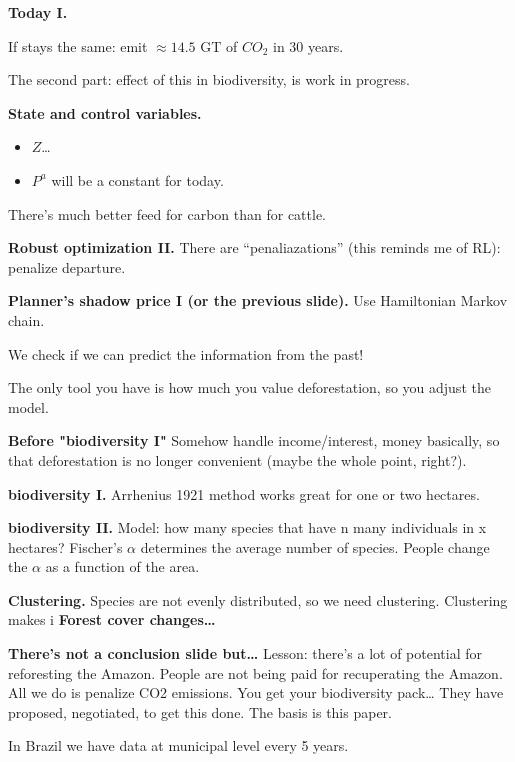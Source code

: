 \medskip\noindent
{\bf Today I.}

If stays the same: emit $\approx 14.5$ GT
of $CO_2$ in 30 years.

The second part: effect of this in
biodiversity, is work in progress.

\medskip\noindent
{\bf State and control variables.}
\begin{itemize}
\item $Z$…
\item $P^a$ will be a constant for today.
\end{itemize}

\begin{remark}
\label{remark-carbon-cattle}
There's much better feed for carbon
than for cattle.
\end{remark}

\medskip\noindent
{\bf Robust optimization II.}
There are ``penaliazations'' (this reminds
me of RL): penalize departure.

\medskip\noindent
{\bf Planner's shadow price I
(or the previous slide).}
Use Hamiltonian Markov chain.

We check if we can predict the
information from the past!

The only tool you have is how much you value
deforestation, so you adjust the model.

\medskip\noindent
{\bf Before "biodiversity I"}
Somehow handle income/interest, money
basically, so that deforestation is no
longer convenient (maybe the whole point,
right?).

\medskip\noindent
{\bf biodiversity I.}
Arrhenius 1921 method works great
for one or two hectares.

\medskip\noindent
{\bf biodiversity II.}
Model: how many species that have n many
individuals in x hectares? Fischer's $\alpha$
determines the average number of species.
People change the $\alpha$ as a function
of the area.

\medskip\noindent
{\bf Clustering.}
Species are not evenly distributed,
so we need clustering. Clustering makes
i
\medskip\noindent
{\bf Forest cover changes…}

\medskip\noindent
{\bf There's not a conclusion slide but…}
Lesson: there's a lot of potential
for reforesting the Amazon.
People are not being paid for recuperating
the Amazon. All we do is penalize CO2
emissions. You get your biodiversity pack…
They have proposed, negotiated, to get this
done. The basis is this paper.

In Brazil we have data at municipal level
every 5 years.

